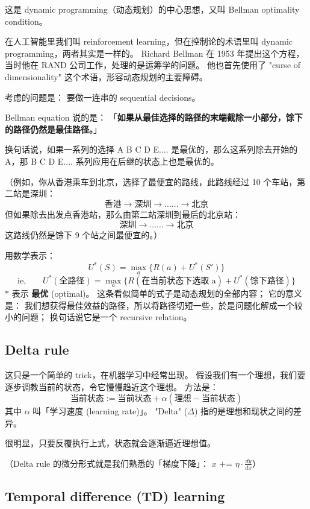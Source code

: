 \documentclass[orivec]{llncs}
\newcommand{\emp}[1]{\textbf{\textcolor{Cerulean}{#1}}}
\begin{document}
这是 dynamic programming（动态规划）的中心思想，又叫 Bellman optimality condition。

在人工智能里我们叫 reinforcement learning，但在控制论的术语里叫 dynamic programming，两者其实是一样的。 Richard Bellman 在 1953 年提出这个方程，当时他在 RAND 公司工作，处理的是运筹学的问题。 他也首先使用了 "curse of dimensionality" 这个术语，形容动态规划的主要障碍。

考虑的问题是： 要做一连串的 sequential decisions。

Bellman equation 说的是： 「\textbf{如果从最佳选择的路径的末端截除一小部分，馀下的路径仍然是最佳路径。}」

换句话说，如果一系列的选择 A B C D E.... 是最优的，那么这系列除去开始的 A，那 B C D E.... 系列应用在后继的状态上也是最优的。

（例如，你从香港乘车到北京，选择了最便宜的路线，此路线经过 10 个车站，第二站是深圳：
$$ \mbox{香港} \rightarrow \mbox{深圳} \rightarrow ... ... \rightarrow \mbox{北京} $$
但如果除去出发点香港站，那么由第二站深圳到最后的北京站：
$$ \mbox{深圳} \rightarrow ... ... \rightarrow \mbox{北京} $$
这路线仍然是馀下 9 个站之间最便宜的。）

用数学表示：
$$ U^*(S) = \max_a \{ R(a) + U^*(S') \} $$
$$ \mbox{ie,} \quad \quad U^*(\mbox{全路径}) = \max_a \{ R(\mbox{在当前状态下选取 a}) + U^*(\mbox{馀下路径}) \} $$
$*$ 表示 \emp{最优} (optimal)。 这条看似简单的式子是动态规划的全部内容； 它的意义是： 我们想获得最佳效益的路径，所以将路径切短一些，於是问题化解成一个较小的问题；  换句话说它是一个 recursive relation。

\subsection{Delta rule}

这只是一个简单的 trick，在机器学习中经常出现。  假设我们有一个理想，我们要逐步调教当前的状态，令它慢慢趋近这个理想。 方法是： 
$$ \mbox{当前状态} := \mbox{当前状态} + \alpha ( \mbox{理想} - \mbox{当前状态}) $$
其中 $\alpha$ 叫「学习速度 (learning rate)」。 "Delta" ($\Delta$) 指的是理想和现状之间的差异。

很明显，只要反覆执行上式，状态就会逐渐逼近理想值。

（Delta rule 的微分形式就是我们熟悉的「梯度下降」： $x \mbox{ += } \eta \cdot \frac{dy}{dx}$）

\subsection{Temporal difference (TD) learning}
\end{document}

